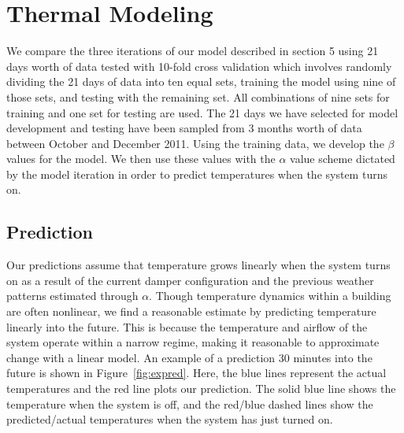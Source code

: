 \section{Thermal Modeling}
\label{sec:thermalModelingResults}


We compare the three iterations of our model described in section 5 using 21
days worth of data tested with 10-fold cross validation which involves randomly
dividing the 21 days of data into ten equal sets, training the model using nine
of those sets, and testing with the remaining set. All combinations of nine sets
for training and one set for testing are used. The 21 days we have selected for
model development and testing have been sampled from 3 months worth of data
between October and December 2011. Using the training data, we develop the
$\beta$ values for the model. We then use these values with the $\alpha$ value
scheme dictated by the model iteration in order to predict temperatures when the
system turns on.

\subsection{Prediction}
Our predictions assume that temperature grows linearly when the system turns on
as a result of the current damper configuration and the previous weather
patterns estimated through $\alpha$. Though temperature dynamics within a
building are often nonlinear, we find a reasonable estimate by predicting
temperature linearly into the future. This is because the temperature and
airflow of the system operate within a narrow regime, making it reasonable to
approximate change with a linear model. An example of a prediction 30 minutes
into the future is shown in Figure~\ref{fig:expred}. Here, the blue lines
represent the actual temperatures and the red line plots our prediction. The
solid blue line shows the temperature when the system is off, and the red/blue
dashed lines show the predicted/actual temperatures when the system has just
turned on.

